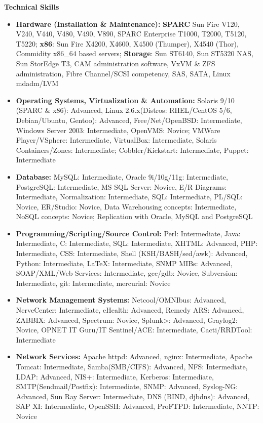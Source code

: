\documentclass[10pt,oneside]{article}
\newenvironment{ressection}[1]{
	\vspace{4pt}
	\textbf{\selectfont\normalsize#1}
	\begin{itemize}
	\vspace{3pt}
}{
	\end{itemize}
}
\newcommand{\resitem}[1]{
	\vspace{-4pt}
	\item \begin{flushleft} #1 \end{flushleft}
}
\begin{document}
\begin{ressection}{Technical Skills}

	\resitem{\textbf{Hardware (Installation \& Maintenance):} \textbf{SPARC} Sun Fire V120, V240, V440, V480, V490, V890, SPARC Enterprise T1000, T2000, T5120, T5220; \textbf{x86}: Sun Fire X4200, X4600, X4500 (Thumper), X4540 (Thor), Commidity x86\_64 based servers; \textbf{Storage}: Sun ST6140, Sun ST5320 NAS, Sun StorEdge T3, CAM administration software, VxVM \& ZFS administration, Fibre Channel/SCSI competency, SAS, SATA, Linux mdadm/LVM}

	\resitem{\textbf{Operating Systems, Virtualization \& Automation:} Solaris 9/10 (SPARC \& x86): Advanced, Linux 2.6.x(Distros: RHEL/CentOS 5/6, Debian/Ubuntu, Gentoo): Advanced, Free/Net/OpenBSD: Intermediate, Windows Server 2003: Intermediate, OpenVMS: Novice; VMWare Player/VSphere: Intermediate, VirtualBox: Intermediate, Solaris Containers/Zones: Intermediate; Cobbler/Kickstart: Intermediate, Puppet: Intermediate}

	\resitem{\textbf{Database:} MySQL: Intermediate, Oracle 9i/10g/11g: Intermediate, PostgreSQL: Intermediate, MS SQL Server: Novice, E/R Diagrams: Intermediate, Normalization: Intermediate, SQL: Intermediate, PL/SQL: Novice, ER/Studio: Novice, Data Warehousing concepts: Intermediate, NoSQL concepts: Novice; Replication with Oracle, MySQL and PostgreSQL}

	\resitem{\textbf{Programming/Scripting/Source Control:} Perl: Intermediate, Java: Intermediate, C: Intermediate, SQL: Intermediate, XHTML: Advanced, PHP: Intermediate, CSS: Intermediate, Shell (KSH/BASH/sed/awk): Advanced, Python: Intermediate, \LaTeX: Intermediate, SNMP MIBs: Advanced, SOAP/XML/Web Services: Intermediate, gcc/gdb: Novice, Subversion: Intermediate, git: Intermediate, mercurial: Novice}

	\resitem{\textbf{Network Management Systems:} Netcool/OMNIbus: Advanced, NerveCenter: Intermediate, eHealth: Advanced, Remedy ARS: Advanced, ZABBIX: Advanced, Spectrum: Novice, Splunk>: Advanced, Graylog2: Novice, OPNET IT Guru/IT Sentinel/ACE: Intermediate, Cacti/RRDTool: Intermediate}

	\resitem{\textbf{Network Services:} Apache httpd: Advanced, nginx: Intermediate, Apache Tomcat: Intermediate, Samba(SMB/CIFS): Advanced, NFS: Intermediate, LDAP: Advanced, NIS+: Intermediate, Kerberos: Intermediate,  SMTP(Sendmail/Postfix): Intermediate, SNMP: Advanced, Syslog-NG: Advanced, Sun Ray Server: Intermediate, DNS (BIND, djbdns): Advanced, SAP XI: Intermediate, OpenSSH: Advanced, ProFTPD: Intermediate, NNTP: Novice}


\end{ressection}
\end{document}

